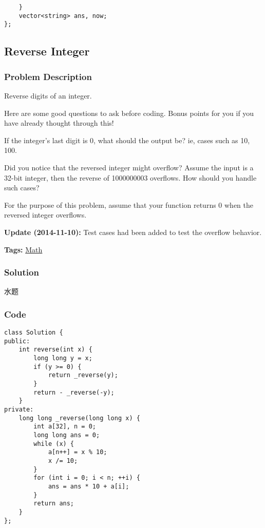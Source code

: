 \documentclass{article}
\begin{document}
\begin{CJK*}{UTF8}{gkai}
\begin{lstlisting}
    }
    vector<string> ans, now;
}; 
\end{lstlisting}


\subsection{ Reverse Integer }
\label{ Reverse Integer }

\subsubsection*{Problem Description}
Reverse digits of an integer.

Here are some good questions to ask before coding. Bonus points for you if you have already thought through this!

If the integer's last digit is 0, what should the output be? ie, cases such as 10, 100.

Did you notice that the reversed integer might overflow? Assume the input is a 32-bit integer, then the reverse of 1000000003 overflows. How should you handle such cases?

For the purpose of this problem, assume that your function returns 0 when the reversed integer overflows.

\textbf{Update (2014-11-10):}
Test cases had been added to test the overflow behavior.


\textbf{Tags: }
\hyperref[ Math ]{ Math }



\subsubsection*{Solution}
水题

\subsubsection*{Code}
\begin{lstlisting}
class Solution {
public:
    int reverse(int x) {
        long long y = x;
        if (y >= 0) {
            return _reverse(y);
        }
        return - _reverse(-y);
    }
private:
    long long _reverse(long long x) {
        int a[32], n = 0;
        long long ans = 0;
        while (x) {
            a[n++] = x % 10;
            x /= 10;
        }
        for (int i = 0; i < n; ++i) {
            ans = ans * 10 + a[i];
        }
        return ans;
    }
}; 
\end{lstlisting}



\end{CJK*}
\end{document}
